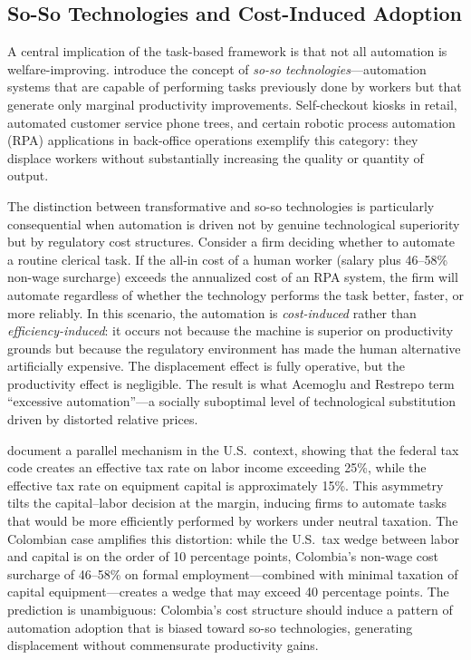 \documentclass{article}
\begin{document}
\subsection{So-So Technologies and Cost-Induced Adoption}
\label{subsec:soso}

A central implication of the task-based framework is that not all automation is welfare-improving. \cite{acemoglu2019automation} introduce the concept of \textit{so-so technologies}---automation systems that are capable of performing tasks previously done by workers but that generate only marginal productivity improvements. Self-checkout kiosks in retail, automated customer service phone trees, and certain robotic process automation (RPA) applications in back-office operations exemplify this category: they displace workers without substantially increasing the quality or quantity of output.

The distinction between transformative and so-so technologies is particularly consequential when automation is driven not by genuine technological superiority but by regulatory cost structures. Consider a firm deciding whether to automate a routine clerical task. If the all-in cost of a human worker (salary plus 46--58\% non-wage surcharge) exceeds the annualized cost of an RPA system, the firm will automate regardless of whether the technology performs the task better, faster, or more reliably. In this scenario, the automation is \textit{cost-induced} rather than \textit{efficiency-induced}: it occurs not because the machine is superior on productivity grounds but because the regulatory environment has made the human alternative artificially expensive. The displacement effect is fully operative, but the productivity effect is negligible. The result is what Acemoglu and Restrepo term ``excessive automation''---a socially suboptimal level of technological substitution driven by distorted relative prices.

\cite{acemoglu2020taxes} document a parallel mechanism in the U.S.\ context, showing that the federal tax code creates an effective tax rate on labor income exceeding 25\%, while the effective tax rate on equipment capital is approximately 15\%. This asymmetry tilts the capital--labor decision at the margin, inducing firms to automate tasks that would be more efficiently performed by workers under neutral taxation. The Colombian case amplifies this distortion: while the U.S.\ tax wedge between labor and capital is on the order of 10 percentage points, Colombia's non-wage cost surcharge of 46--58\% on formal employment---combined with minimal taxation of capital equipment---creates a wedge that may exceed 40 percentage points. The prediction is unambiguous: Colombia's cost structure should induce a pattern of automation adoption that is biased toward so-so technologies, generating displacement without commensurate productivity gains.
\end{document}
